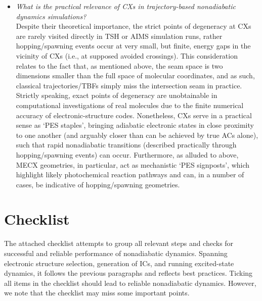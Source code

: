 \documentclass[9pt,bestpractices,pubversion]{livecoms}
\begin{document}
\begin{itemize}
\item{\textit{What is the practical relevance of CXs in trajectory-based nonadiabatic dynamics simulations?} \\
Despite their theoretical importance, the strict points of degeneracy at CXs are rarely visited directly in TSH or AIMS simulation runs,\cite{levine2007isomerization,curchod2017ab} rather hopping/spawning events occur at very small, but finite, energy gaps in the vicinity of CXs (i.e., at supposed avoided crossings).
This consideration relates to the fact that, as mentioned above, the seam space is two dimensions smaller than the full space of molecular coordinates, and as such, classical trajectories/TBFs simply miss the intersection seam in practice.\cite{curchod2018ab}
Strictly speaking, exact points of degeneracy are unobtainable in computational investigations of real molecules due to the finite numerical accuracy of electronic-structure codes.\cite{zhu_non-adiabaticity_2016,yarkony_conical_2001}
Nonetheless, CXs serve in a practical sense as `PES staples',\cite{todd2024private} bringing adiabatic electronic states in close proximity to one another (and arguably closer than can be achieved by true ACs alone), such that rapid nonadiabatic transitions (described practically through hopping/spawning events) can occur. 
Furthermore, as alluded to above, MECX geometries, in particular, act as mechanistic `PES signposts',\cite{levine2007isomerization,curchod2017ab} which highlight likely photochemical reaction pathways and can, in a number of cases, be indicative of hopping/spawning geometries.
}

\end{itemize}

\section{Checklist}
\label{sec:checklist}

The attached checklist attempts to group all relevant steps and checks for successful and reliable performance of nonadiabatic dynamics. Spanning electronic structure selection, generation of ICs, and running excited-state dynamics, it follows the previous paragraphs and reflects best practices. Ticking all items in the checklist should lead to reliable nonadiabatic dynamics. However, we note that the checklist may miss some important points. 
\end{document}
